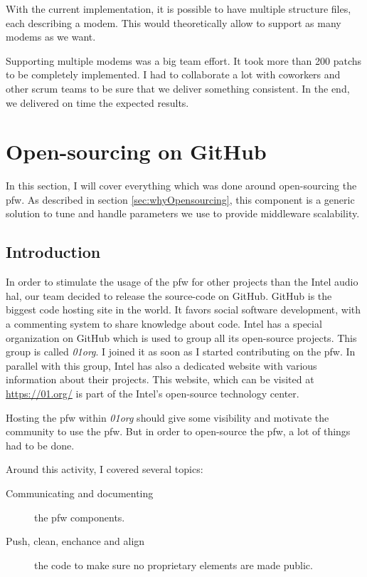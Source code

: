 With the current implementation, it is possible to have multiple structure files, each describing a modem. This would theoretically allow
to support as many modems as we want.

Supporting multiple modems was a big team effort. It took more than 200 patchs to be completely implemented.
I had to collaborate a lot with coworkers and other \gls{scrum} teams to be sure that we deliver something consistent.
In the end, we delivered on time the expected results.


\newpage


\section{Open-sourcing on GitHub}

In this section, I will cover everything which was done around open-sourcing the \gls{pfw}.
As described in section \ref{sec:whyOpensourcing}, this component is a generic solution
to tune and handle parameters we use to provide middleware scalability.

\subsection{Introduction}
In order to stimulate the usage of the \gls{pfw} for other projects than the Intel audio \gls{hal},
our team decided to release the source-code on \gls{GitHub}.
\gls{GitHub} is the biggest code hosting site in the world. It favors social software development, with a commenting system
to share knowledge about code.
Intel has a special organization on \gls{GitHub} which is used to group all its open-source projects. This group is called \emph{01org}. I
joined it as soon as I started contributing on the \gls{pfw}.
In parallel with this group, Intel has also a dedicated website with various information about their projects. This website, which can be
visited at \url{https://01.org/} is part of the Intel's open-source technology center.

Hosting the \gls{pfw} within \emph{01org} should give some visibility and motivate
the community to use the \gls{pfw}. But in order to open-source the \gls{pfw}, a lot of things had to be done.

Around this activity, I covered several topics:
\begin{description}
    \item[Communicating and documenting] the \gls{pfw} components.
    \item[Push, clean, enchance and align] the code to make sure no proprietary
        elements are made public.
\end{description}

